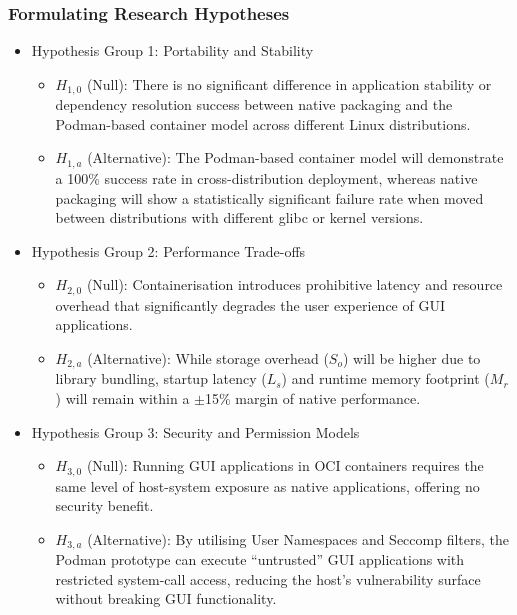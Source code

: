 \documentclass[journal,onecolumn]{IEEEtran}
\begin{document}
\subsubsection{Formulating Research Hypotheses}
\begin{itemize}
    \item Hypothesis Group 1: Portability and Stability
    \begin{itemize}
        \item $H_{1,0}$ (Null): There is no significant difference in application stability or dependency resolution success between native packaging and the Podman-based container model across different Linux distributions.
        \item $H_{1,a}$ (Alternative): The Podman-based container model will demonstrate a 100\% success rate in cross-distribution deployment, whereas native packaging will show a statistically significant failure rate when moved between distributions with different glibc or kernel versions.
    \end{itemize}
    \item Hypothesis Group 2: Performance Trade-offs
    \begin{itemize}
        \item $H_{2,0}$ (Null): Containerisation introduces prohibitive latency and resource overhead that significantly degrades the user experience of GUI applications.
        \item $H_{2,a}$ (Alternative): While storage overhead ($S_o$) will be higher due to library bundling, startup latency ($L_s$) and runtime memory footprint ($M_r$) will remain within a $\pm$15\% margin of native performance.
    \end{itemize}
    \item Hypothesis Group 3: Security and Permission Models
    \begin{itemize}
        \item $H_{3,0}$ (Null): Running GUI applications in OCI containers requires the same level of host-system exposure as native applications, offering no security benefit.
        \item $H_{3,a}$ (Alternative): By utilising User Namespaces and Seccomp filters, the Podman prototype can execute ``untrusted'' GUI applications with restricted system-call access, reducing the host's vulnerability surface without breaking GUI functionality.
    \end{itemize}
\end{itemize}
\end{document}
